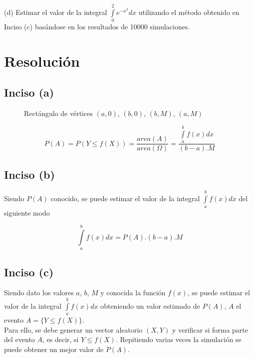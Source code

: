 \documentclass[a4paper]{article}
\begin{document}
(d) Estimar el valor de la integral $\int\limits_0^2 e^{-x^{2}} dx$ utilizando
el método obtenido en Inciso (c) basándose en los resultados de 10000
simulaciones.

\section{Resolución}
\subsection{Inciso (a)}
\begin{figure}[h]
  \centering
  \caption{Rectángulo de vértices $(a, 0)$, $(b, 0)$, $(b, M)$, $(a, M)$}
\end{figure}

\[
  P(A) = P( Y \leqslant f(X) ) = \frac{ area(A) }{ area(\Omega) } =
  \frac{ \int\limits_a^b f(x) dx }{ (b-a) . M }
\]

\newpage
\subsection{Inciso (b)}

Siendo $P(A)$ conocido, se puede estimar el valor de la integral
$\int\limits_a^b f(x) dx$ del siguiente modo

\[
  \int\limits_a^b f(x) dx = P(A).(b-a) . M
\]

\subsection{Inciso (c)}
Siendo dato los valores $a$, $b$, $M$ y conocida la función $f(x)$, se puede
estimar el valor de la integral $\int\limits_a^b f(x) dx$ obteniendo un valor
estimado de $P(A)$, $A$ el evento $A = \{ Y \leqslant f(X) \}$. \\

Para ello, se debe generar un vector aleatorio $(X,Y)$ y verificar si forma
parte del evento $A$, es decir, si $Y \leqslant f(X)$. Repitiendo varias veces
la simulación se puede obtener un mejor valor de $P(A)$.
\end{document}
